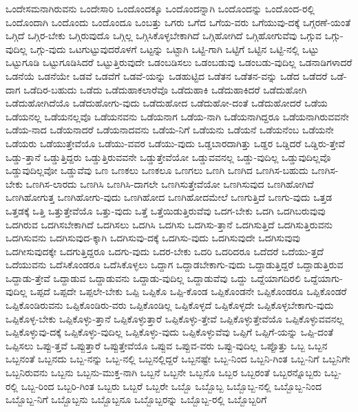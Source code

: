 {ಒಂದೇಸಮನಾಗಿರುವನು
ಒಂದೇಸಾರಿ
ಒಂದೊಂದಕ್ಕೂ
ಒಂದೊಂದನ್ನಾಗಿ
ಒಂದೊಂದನ್ನು
ಒಂದೊಂದ-ರಲ್ಲಿ
ಒಂದೊಂದಾಗಿ
ಒಂದೊಂದು
ಒಂದೊಂದೂ
ಒಂಬತ್ತು
ಒಗರು
ಒಗೆದ
ಒಗೆಯ-ವರು
ಒಗೆಯುವು-ದಕ್ಕೆ
ಒಗ್ಗರಣೆ-ಯಂತೆ
ಒಗ್ಗಿದೆ
ಒಗ್ಗಿರ-ಬೇಕು
ಒಗ್ಗಿರುವುದೊ
ಒಗ್ಗಿಲ್ಲ
ಒಗ್ಗಿಸಿಕೊಳ್ಳಬೇಕಾಗಿದೆ
ಒಗ್ಗಿಹೋಗಿದೆ
ಒಗ್ಗಿಹೋಗುವೆವು
ಒಗ್ಗುವ
ಒಗ್ಗು-ವುದಿಲ್ಲ
ಒಗ್ಗು-ವುದು
ಒಟಗುಟ್ಟುವುದರೊಳಗೆ
ಒಟ್ಟನ್ನು
ಒಟ್ಟಾಗಿ
ಒಟ್ಟಿ-ಗಾಗಿ
ಒಟ್ಟಿಗೆ
ಒಟ್ಟಿನ
ಒಟ್ಟಿ-ನಲ್ಲಿ
ಒಟ್ಟು
ಒಟ್ಟುಗೂಡಿ
ಒಟ್ಟುಗೂಡಿಸಿದರೆ
ಒಟ್ಟುತ್ತಿರುವುದೇ
ಒಡಂಬಡಿಸಲು
ಒಡಂಬಡುವು
ಒಡಂಬಡು-ವುದಿಲ್ಲ
ಒಡನಾಡಿಗಳಾದರೆ
ಒಡನೆಯೆ
ಒಡನೆಯೇ
ಒಡವೆ
ಒಡವೆಗೆ
ಒಡವೆ-ಯನ್ನು
ಒಡಹುಟ್ಟಿದ
ಒಡೆತನ
ಒಡೆತನ-ವನ್ನು
ಒಡೆದ
ಒಡೆದರೆ
ಒಡೆ-ದಾಗ
ಒಡೆದಿರ-ಬಹುದು
ಒಡೆದು
ಒಡೆದುಹಾಕಲಾರೆವೊ
ಒಡೆದುಹಾಕಿ
ಒಡೆದುಹಾಕಿದರೆ
ಒಡೆದುಹೋಗಿ
ಒಡೆದುಹೋಗಿದೆಯೊ
ಒಡೆದುಹೋಗು-ವುದು
ಒಡೆದುಹೋದ
ಒಡೆದುಹೋ-ದಂತೆ
ಒಡೆದುಹೋದರೆ
ಒಡೆಯ
ಒಡೆಯನಲ್ಲ
ಒಡೆಯನಲ್ಲವೊ
ಒಡೆಯನವನು
ಒಡೆಯನಾಗ
ಒಡೆಯ-ನಾಗಿ
ಒಡೆಯನಾಗಿದ್ದರೂ
ಒಡೆಯನಾಗಿರುವವನೇ
ಒಡೆಯ-ನಾದ
ಒಡೆಯನಾದರೆ
ಒಡೆಯನಾದವನು
ಒಡೆಯ-ನಿಗೆ
ಒಡೆಯನು
ಒಡೆಯನೆ
ಒಡೆಯನೆಂಬ
ಒಡೆಯನೇ
ಒಡೆಯರು
ಒಡೆಯುತ್ತೇವೆಯೊ
ಒಡೆಯು-ವವರ
ಒಡೆಯು-ವುದು
ಒಡ್ಡಬಾರದಾಗಿತ್ತು
ಒಡ್ಡರ
ಒಡ್ಡಿದರೆ
ಒಡ್ಡಿರು-ತ್ತೇವೆ
ಒಡ್ಡು-ತ್ತಾನೆ
ಒಡ್ಡುತ್ತಿದ್ದರು
ಒಡ್ಡುತ್ತಿರುವವನೇ
ಒಡ್ಡುತ್ತೇವೆಯೋ
ಒಡ್ಡುವವನಲ್ಲ
ಒಡ್ಡು-ವುದಿಲ್ಲ
ಒಡ್ಡುವುದಿಲ್ಲವೊ
ಒಡ್ಡುವುದಿಲ್ಲವೋ
ಒಡ್ಡುವೆವು
ಒಣ
ಒಣಕಲು
ಒಣಕಲೂ
ಒಣಗಲು
ಒಣಗಿ
ಒಣಗಿದ
ಒಣಗಿಸ-ಬಹುದು
ಒಣಗಿಸ-ಬೇಕು
ಒಣಗಿಸ-ಲಾರದು
ಒಣಗಿಸಿ
ಒಣಗಿಸಿ-ದಾಗಲೇ
ಒಣಗಿಸುತ್ತೇವೆಯೋ
ಒಣಗಿಸುವುದ
ಒಣಗಿಹೋಗಿದೆ
ಒಣಗಿಹೋಗುತ್ತ
ಒಣಗಿಹೋಗು-ವುದು
ಒಣಗಿಹೋದ
ಒಣಗಿಹೋದಮೇಲೆ
ಒಣಗುತ್ತಿದೆ
ಒಣಗು-ವುದು
ಒತ್ತಡ
ಒತ್ತಡಕ್ಕೆ
ಒತ್ತಿ
ಒತ್ತುತ್ತೇವೆಯೊ
ಒತ್ತು-ವುದು
ಒತ್ತೆ
ಒತ್ತೆಯಿಡುತ್ತಿರುವೆವು
ಒದಗ-ಬೇಕು
ಒದಗಿ
ಒದಗಿಬರುವುವು
ಒದಗಿರುವ
ಒದಗಿಸಬೇಕಾಗಿದೆ
ಒದಗಿಸಲು
ಒದಗಿಸಿ
ಒದಗಿಸು
ಒದಗಿಸು-ತ್ತಾನೆ
ಒದಗಿಸುತ್ತಿದೆ
ಒದಗಿಸುತ್ತಿರುವನು
ಒದಗಿಸುವನು
ಒದಗಿಸುವುದ-ಕ್ಕಾಗಿ
ಒದಗಿಸುವು-ದಕ್ಕೆ
ಒದಗಿಸು-ವುದು
ಒದಗಿಸುವುದೇ
ಒದಗಿಸುವುವು
ಒದಗೀಸುವುದಕ್ಕೇ
ಒದಗುತ್ತಿದ್ದರೂ
ಒದಗು-ವುದು
ಒದರ-ಬೇಕು
ಒದರಿ
ಒದರಿದರೂ
ಒದೆದರೆ
ಒದೆಯು-ತ್ತದೆ
ಒದೆಯುವನು
ಒದೆಸಿಕೊಂಡರೂ
ಒದೆಸಿಕೊಳ್ಳಲು
ಒದ್ದಾಗ
ಒದ್ದಾಡಬೇಕಾಗು-ವುದು
ಒದ್ದಾಡುತ್ತಿದ್ದರೆ
ಒದ್ದಾಡುತ್ತಿರುವ
ಒದ್ದಾಡು-ತ್ತೇವೆ
ಒದ್ದಾಡುವ
ಒದ್ದಾಡುವನು
ಒದ್ದಾಡು-ವುದಿಲ್ಲ
ಒದ್ದಾಡುವೆವು
ಒದ್ದು
ಒದ್ದೆಯಾಗದಿರಲಿ
ಒದ್ದೆಯಾಗು-ವುದಿಲ್ಲ
ಒಪ್ಪದೆ
ಒಪ್ಪದೇ
ಒಪ್ಪಲೇ-ಬೇಕು
ಒಪ್ಪಿ
ಒಪ್ಪಿಕೊ
ಒಪ್ಪಿ-ಕೊಂಡ
ಒಪ್ಪಿಕೊಂಡನೇ
ಒಪ್ಪಿಕೊಂಡರೂ
ಒಪ್ಪಿಕೊಂಡರೆ
ಒಪ್ಪಿಕೊಂಡಿರುವನು
ಒಪ್ಪಿಕೊಂಡಿರು-ವರು
ಒಪ್ಪಿಕೊಂಡಿಲ್ಲ
ಒಪ್ಪಿಕೊಳ್ಳದೆ
ಒಪ್ಪಿಕೊಳ್ಳದೇ
ಒಪ್ಪಿಕೊಳ್ಳಬೇಕಾಗು-ವುದು
ಒಪ್ಪಿಕೊಳ್ಳ-ಬೇಕು
ಒಪ್ಪಿಕೊಳ್ಳು-ತ್ತಾನೆ
ಒಪ್ಪಿಕೊಳ್ಳುತ್ತಾರೆ
ಒಪ್ಪಿಕೊಳ್ಳು-ತ್ತೇವೆ
ಒಪ್ಪಿಕೊಳ್ಳುತ್ತೇವೆಯೊ
ಒಪ್ಪಿಕೊಳ್ಳುವವನಲ್ಲ
ಒಪ್ಪಿಕೊಳ್ಳುವು-ದಕ್ಕೆ
ಒಪ್ಪಿಕೊಳ್ಳು-ವುದಿಲ್ಲ
ಒಪ್ಪಿಕೊಳ್ಳು-ವುದು
ಒಪ್ಪಿಕೊಳ್ಳುವೆವು
ಒಪ್ಪಿಗೆ
ಒಪ್ಪಿಗೆ-ಯನ್ನು
ಒಪ್ಪಿ-ದಂತೆ
ಒಪ್ಪಿಸಲು
ಒಪ್ಪು-ತ್ತವೆ
ಒಪ್ಪುತ್ತಾರೆ
ಒಪ್ಪುತ್ತೇವೆಯೊ
ಒಪ್ಪುವ
ಒಪ್ಪುವ-ವರು
ಒಪ್ಪು-ವುದಿಲ್ಲ
ಒಪ್ಪೊತ್ತು
ಒಬ್ಬ
ಒಬ್ಬನ
ಒಬ್ಬನಂತೆ
ಒಬ್ಬನದು
ಒಬ್ಬ-ನನ್ನು
ಒಬ್ಬ-ನಲ್ಲಿ
ಒಬ್ಬನಲ್ಲಿದ್ದರೆ
ಒಬ್ಬನಷ್ಟೇ
ಒಬ್ಬ-ನಿಂದ
ಒಬ್ಬನಿ-ಗಿಂತ
ಒಬ್ಬ-ನಿಗೆ
ಒಬ್ಬನಿಗೇ
ಒಬ್ಬನಿರುವನು
ಒಬ್ಬನು
ಒಬ್ಬನು-ಮುಕ್ತ-ನಾಗಿ
ಒಬ್ಬನೆ
ಒಬ್ಬನೇ
ಒಬ್ಬನೊ
ಒಬ್ಬರ
ಒಬ್ಬರಂತೆ
ಒಬ್ಬರನ್ನೊಬ್ಬರು
ಒಬ್ಬ-ರಲ್ಲಿ
ಒಬ್ಬ-ರಿಂದ
ಒಬ್ಬರಿ-ಗಿಂತ
ಒಬ್ಬರು
ಒಬ್ಬರೆ
ಒಬ್ಬರೇ
ಒಬ್ಬೊ
ಒಬ್ಬೊಬ್ಬ
ಒಬ್ಬೊಬ್ಬ-ನಲ್ಲಿ
ಒಬ್ಬೊಬ್ಬ-ನಿಂದ
ಒಬ್ಬೊಬ್ಬ-ನಿಗೆ
ಒಬ್ಬೊಬ್ಬನು
ಒಬ್ಬೊಬ್ಬನೂ
ಒಬ್ಬೊಬ್ಬರನ್ನು
ಒಬ್ಬೊಬ್ಬ-ರಲ್ಲಿ
ಒಬ್ಬೊಬ್ಬರಿಗೆ
}
